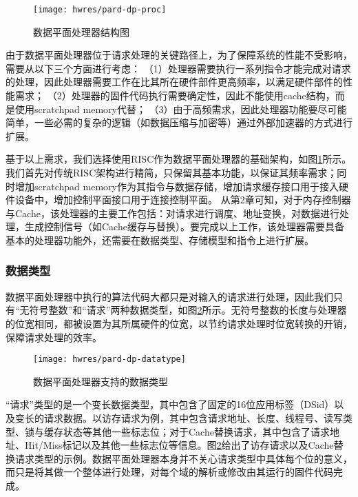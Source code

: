 \begin{figure}[tb]
  \centering
  \texttt{[image: hwres/pard-dp-proc]}
  \caption{数据平面处理器结构图}
  \label{fig:pard-dp-proc}
\end{figure}

由于数据平面处理器位于请求处理的关键路径上，为了保障系统的性能不受影响，需要从以下三个方面进行考虑：
（1）处理器需要执行一系列指令才能完成对请求的处理，因此处理器需要工作在比其所在硬件部件更高频率，以满足硬件部件的性能需求；
（2）处理器的固件代码执行需要确定性，因此不能使用cache结构，而是使用scratchpad memory代替；
（3）由于高频需求，因此处理器功能要尽可能简单，一些必需的复杂的逻辑（如数据压缩与加密等）通过外部加速器的方式进行扩展。

基于以上需求，我们选择使用RISC作为数据平面处理器的基础架构，如图\ref{fig:pard-dp-proc}所示。我们首先对传统RISC架构进行精简，只保留其基本功能，以保证其频率需求；同时增加scratchpad memory作为其指令与数据存储，增加请求缓存接口用于接入硬件设备中，增加控制平面接口用于连接控制平面。
从第2章可知，对于内存控制器与Cache，该处理器的主要工作包括：对请求进行调度、地址变换，对数据进行处理，生成控制信号（如Cache缓存与替换）。要完成以上工作，该处理器需要具备基本的处理器功能外，还需要在数据类型、存储模型和指令上进行扩展。


\subsubsection{数据类型}

数据平面处理器中执行的算法代码大都只是对输入的请求进行处理，因此我们只有``无符号整数''和``请求''两种数据类型，如图\ref{fig:pard-dp-datatype}所示。无符号整数的长度与处理器的位宽相同，都被设置为其所属硬件的位宽，以节约请求处理时位宽转换的开销，保障请求处理的效率。

\begin{figure}[H]
  \centering
  \texttt{[image: hwres/pard-dp-datatype]}
  \caption{数据平面处理器支持的数据类型}
  \label{fig:pard-dp-datatype}
\end{figure}
 
``请求''类型的是一个变长数据类型，其中包含了固定的16位应用标签（DSid）以及变长的请求数据。以访存请求为例，其中包含请求地址、长度、线程号、读写类型、锁与缓存状态等其他一些标志位；对于Cache替换请求，其中包含了请求地址、Hit/Miss标记以及其他一些标志位等信息。图\ref{fig:pard-dp-datatype}给出了访存请求以及Cache替换请求类型的示例。数据平面处理器本身并不关心请求类型中具体每个位的意义，而只是将其做一个整体进行处理，对每个域的解析或修改由其运行的固件代码完成。

